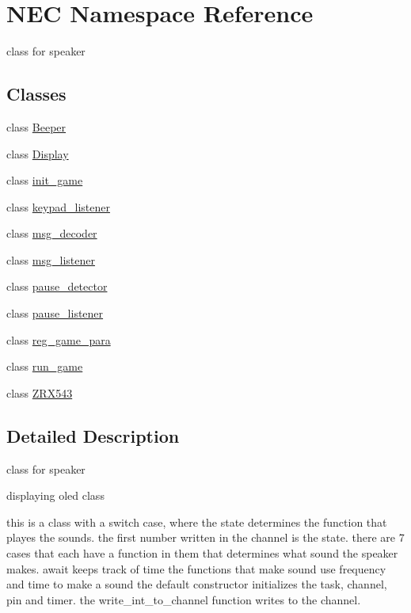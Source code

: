 \hypertarget{namespaceNEC}{}\section{N\+EC Namespace Reference}
\label{namespaceNEC}


class for speaker  


\subsection*{Classes}
\begin{DoxyCompactItemize}
\item 
class \hyperlink{classNEC_1_1Beeper}{Beeper}
\item 
class \hyperlink{classNEC_1_1Display}{Display}
\item 
class \hyperlink{classNEC_1_1init__game}{init\+\_\+game}
\item 
class \hyperlink{classNEC_1_1keypad__listener}{keypad\+\_\+listener}
\item 
class \hyperlink{classNEC_1_1msg__decoder}{msg\+\_\+decoder}
\item 
class \hyperlink{classNEC_1_1msg__listener}{msg\+\_\+listener}
\item 
class \hyperlink{classNEC_1_1pause__detector}{pause\+\_\+detector}
\item 
class \hyperlink{classNEC_1_1pause__listener}{pause\+\_\+listener}
\item 
class \hyperlink{classNEC_1_1reg__game__para}{reg\+\_\+game\+\_\+para}
\item 
class \hyperlink{classNEC_1_1run__game}{run\+\_\+game}
\item 
class \hyperlink{classNEC_1_1ZRX543}{Z\+R\+X543}
\end{DoxyCompactItemize}


\subsection{Detailed Description}
class for speaker 

displaying oled class

this is a class with a switch case, where the state determines the function that \textquotesingle{}playes\textquotesingle{} the sounds. the first number written in the channel is the state. there are 7 cases that each have a function in them that determines what sound the speaker makes. await keeps track of time the functions that make sound use frequency and time to make a sound the default constructor initializes the task, channel, pin and timer. the write\+\_\+int\+\_\+to\+\_\+channel function writes to the channel.

